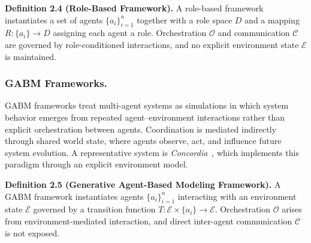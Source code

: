 \noindent\textbf{Definition 2.4 (Role-Based Framework).}
A role-based framework instantiates a set of agents $\{a_i\}_{i=1}^{n}$ together with a role space $D$ and a mapping $R:\{a_i\}\rightarrow D$ assigning each agent a role. Orchestration $\mathcal{O}$ and communication $\mathcal{C}$ are governed by role-conditioned interactions, and no explicit environment state $\mathcal{E}$ is maintained.


\vspace{-2mm}
\subsubsection{GABM Frameworks.}
GABM frameworks treat multi-agent systems as simulations in which system behavior emerges from repeated agent--environment interactions rather than explicit orchestration between agents. Coordination is mediated indirectly through shared world state, where agents observe, act, and influence future system evolution. A representative system is \emph{Concordia}~\cite{vezhnevets2023generative}, which implements this paradigm through an explicit environment model.

\noindent\textbf{Definition 2.5 (Generative Agent-Based Modeling Framework).}
A GABM framework instantiates agents $\{a_i\}_{i=1}^{n}$ interacting with an environment state $\mathcal{E}$ governed by a transition function $T:\mathcal{E}\times\{a_i\}\rightarrow\mathcal{E}$. Orchestration $\mathcal{O}$ arises from environment-mediated interaction, and direct inter-agent communication $\mathcal{C}$ is not exposed.

